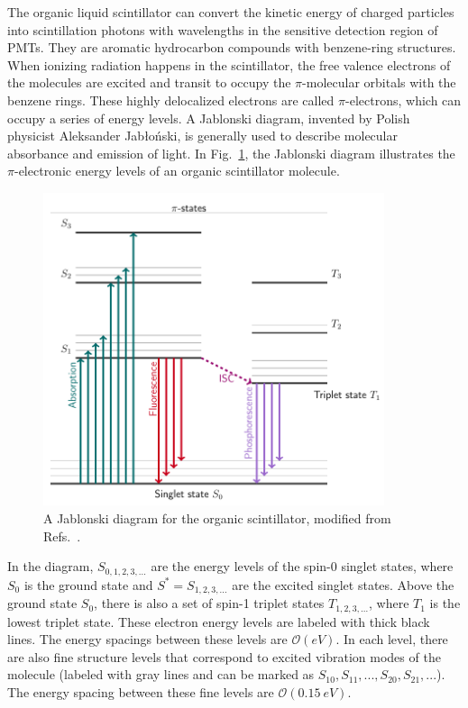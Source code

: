 The organic liquid scintillator can convert the kinetic energy of charged particles into scintillation photons with wavelengths in the sensitive detection region of PMTs. They are aromatic hydrocarbon compounds with benzene-ring structures. When ionizing radiation happens in the scintillator, the free valence electrons of the molecules are excited and transit to occupy the $\pi$-molecular orbitals with the benzene rings. These highly delocalized electrons are called $\pi$-electrons, which can occupy a series of energy levels. A Jablonski diagram, invented by Polish physicist Aleksander Jab\l o\'{n}ski, is generally used to describe molecular absorbance and emission of light. In Fig.~\ref{jablonski}, the Jablonski diagram illustrates the $\pi$-electronic energy levels of an organic scintillator molecule\cite{knoll2010radiation,leo2012techniques}. 
\begin{figure}[!htb]
	\centering
	\includegraphics[width=10cm]{jablonski.png}
	\caption[A Jablonski diagram for the organic scintillator.]{A Jablonski diagram for the organic scintillator, modified from Refs.~\cite{birks1965theory, knoll2010radiation}.}
	\label{jablonski}
\end{figure}

In the diagram, $S_{0,1,2,3,...}$ are the energy levels of the spin-0 singlet states, where $S_0$ is the ground state and $S^*=S_{1,2,3,...}$ are the excited singlet states. Above the ground state $S_0$, there is also a set of spin-1 triplet states $T_{1,2,3,...}$, where $T_1$ is the lowest triplet state. These electron energy levels are labeled with thick black lines. The energy spacings between these levels are $\mathcal{O}(eV)$. In each level, there are also fine structure levels that correspond to excited vibration modes of the molecule (labeled with gray lines and can be marked as $S_{10}, S_{11}, ..., S_{20}, S_{21}, ...$). The energy spacing between these fine levels are $\mathcal{O}(0.15~eV)$\cite{leo2012techniques, knoll2010radiation}.

